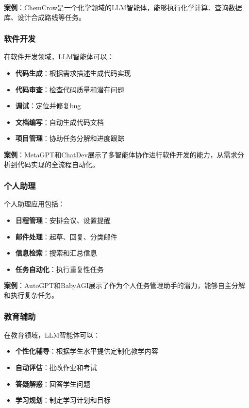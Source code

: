 \textbf{案例}：ChemCrow是一个化学领域的LLM智能体，能够执行化学计算、查询数据库、设计合成路线等任务。

\subsubsection{软件开发}

在软件开发领域，LLM智能体可以：

\begin{itemize}[leftmargin=2em]
    \item \textbf{代码生成}：根据需求描述生成代码实现
    \item \textbf{代码审查}：检查代码质量和潜在问题
    \item \textbf{调试}：定位并修复bug
    \item \textbf{文档编写}：自动生成代码文档
    \item \textbf{项目管理}：协助任务分解和进度跟踪
\end{itemize}

\textbf{案例}：MetaGPT和ChatDev展示了多智能体协作进行软件开发的能力，从需求分析到代码实现的全流程自动化。

\subsubsection{个人助理}

个人助理应用包括：

\begin{itemize}[leftmargin=2em]
    \item \textbf{日程管理}：安排会议、设置提醒
    \item \textbf{邮件处理}：起草、回复、分类邮件
    \item \textbf{信息检索}：搜索和汇总信息
    \item \textbf{任务自动化}：执行重复性任务
\end{itemize}

\textbf{案例}：AutoGPT和BabyAGI展示了作为个人任务管理助手的潜力，能够自主分解和执行复杂任务。

\subsubsection{教育辅助}

在教育领域，LLM智能体可以：

\begin{itemize}[leftmargin=2em]
    \item \textbf{个性化辅导}：根据学生水平提供定制化教学内容
    \item \textbf{自动评估}：批改作业和考试
    \item \textbf{答疑解惑}：回答学生问题
    \item \textbf{学习规划}：制定学习计划和目标
\end{itemize}

